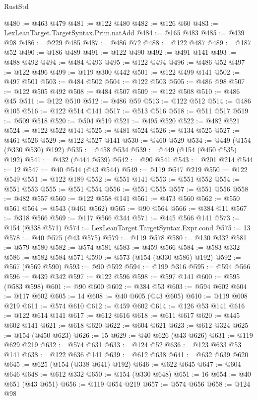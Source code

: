 \begin{lexlean}{RustStd}
\begin{coremodule}
{\begin{coremodule}
{{{{{{{{{{{{{{{{{{{{{{{{{{{{{{{{{{{{{{{{{{{{{{{@480 := @463 @479
@481 := @122 @480
@482 := @126 @60
@483 := LexLeanTarget.TargetSyntax.Prim.natAdd
@484 := @165 @483
@485 := @439 @98
@486 := @229 @485
@487 := @486 @72
@488 := @122 @487
@489 := @187 @52
@490 := @186 @489
@491 := @122 @490
@492 := @491 @141
@493 := @488 @492
@494 := @484 @493
@495 := @122 @494
@496 := @486 @52
@497 := @122 @496
@499 := @119 @300 @442
@501 := @122 @499 @141
@502 := @497 @501
@503 := @484 @502
@504 := @122 @503
@505 := @486 @98
@507 := @122 @505 @492
@508 := @484 @507
@509 := @122 @508
@510 := @486 @45
@511 := @122 @510
@512 := @486 @59
@513 := @122 @512
@514 := @486 @105
@516 := @122 @514 @141
@517 := @513 @516
@518 := @511 @517
@519 := @509 @518
@520 := @504 @519
@521 := @495 @520
@522 := @482 @521
@524 := @122 @522 @141
@525 := @481 @524
@526 := @134 @525
@527 := @461 @526
@529 := @122 @527 @141
@530 := @460 @529
@534 := @449 (@154 (@330 @530) @192)
@535 := @458 @534
@539 := @449 (@154 (@450 @535) @192)
@541 := @432 (@444 @539)
@542 := @90 @541
@543 := @201 @214
@544 := 12
@547 := @40 @544 (@43 @544)
@549 := @119 @547 @219
@550 := @122 @549
@551 := @122 @189
@552 := @551 @141
@553 := @551 @552
@554 := @551 @553
@555 := @551 @554
@556 := @551 @555
@557 := @551 @556
@558 := @482 @557
@560 := @122 @558 @141
@561 := @473 @560
@562 := @550 @561
@564 := @543 (@461 @562)
@565 := @90 @564
@566 := @384 @11
@567 := @318 @566
@569 := @117 @566 @344
@571 := @445 @566 @141
@573 := @154 (@338 @571)
@574 := LexLeanTarget.TargetSyntax.Expr.cond
@575 := 13
@578 := @40 @575 (@43 @575)
@579 := @119 @578
@580 := @130 @332
@581 := @579 @580
@582 := @574 @581
@583 := @459 @566
@584 := @583 @332
@586 := @582 @584 @571
@590 := @573 (@154 (@330 @586) @192)
@592 := @567 (@569 @590)
@593 := @90 @592
@594 := @199 @316
@595 := @594 @566
@596 := @439 @342
@597 := @122 @596
@598 := @597 @141
@600 := @595 (@583 @598)
@601 := @90 @600
@602 := @384 @53
@603 := @594 @602
@604 := @117 @602
@605 := 14
@608 := @40 @605 (@43 @605)
@610 := @119 @608 @219
@611 := @574 @610
@612 := @459 @602
@614 := @126 @53 @141
@616 := @122 @614 @141
@617 := @612 @616
@618 := @611 @617
@620 := @445 @602 @141
@621 := @618 @620
@622 := @604 @621
@623 := @612 @324
@625 := @154 (@450 @623)
@626 := 15
@629 := @40 @626 (@43 @626)
@631 := @119 @629 @219
@632 := @574 @631
@633 := @124 @52
@636 := @123 @633 @53 @141
@638 := @122 @636 @141
@639 := @612 @638
@641 := @632 @639 @620
@645 := @625 (@154 (@338 @641) @192)
@646 := @622 @645
@647 := @604 @646
@648 := @612 @332
@650 := @154 (@330 @648)
@651 := 16
@654 := @40 @651 (@43 @651)
@656 := @119 @654 @219
@657 := @574 @656
@658 := @124 @98
}}}}}}}}}}}}}}}}}}}}}}}}}}}}}}}}}}}}}}}}}}}}}}}
\end{coremodule}}
\end{coremodule}
\end{lexlean}

